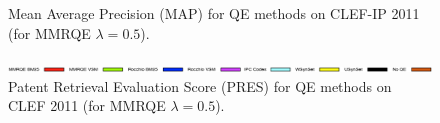 \documentclass[xcolor=x11names,compress]{beamer}
\renewcommand{\(}{\begin{columns}}
\renewcommand{\)}{\end{columns}}
\newcommand{\<}[1]{\begin{column}{#1}}
\renewcommand{\>}{\end{column}}
\begin{document}
\begin{frame}
\begin{figure}
\caption{Mean Average Precision (MAP) for QE methods on CLEF-IP 2011 (for MMRQE
$\lambda=0.5$).}
\label{fig:MAP-CLEF2011}
\end{figure}



\begin{figure}
\begin{centering}
\includegraphics[width=17cm]{../img/legendQE}
\par\end{centering}

\begin{centering}
\par\end{centering}

\begin{centering}
\par\end{centering}

\caption{Patent Retrieval Evaluation Score (PRES) for QE methods on CLEF 2011
(for MMRQE $\lambda=0.5$).}
\label{fig:PRES-CLEF2011}
\end{figure}

\end{frame}
\end{document}
